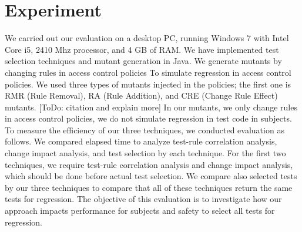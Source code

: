 \section{Experiment}\label{sec:experiment}

We carried out our evaluation on a desktop PC, running Windows 7 with Intel Core i5, 2410 Mhz processor, and 4 GB of RAM. 
We have implemented test selection techniques and mutant generation in Java.
We generate mutants by changing rules
in access control policies To simulate regression in access control policies.
We used three types of mutants injected in the policies; the first one
is RMR (Rule Removal), RA (Rule Addition), and CRE (Change Rule Effect)
mutants. [ToDo: citation and explain more] In our mutants, we only change rules in access control policies,
we do not simulate regression in test code in subjects.
To measure the efficiency of our three techniques, we conducted evaluation as follows. 
We compared elapsed time to analyze test-rule correlation analysis,
change impact analysis, and test selection by each technique.
For the first two techniques, we require test-rule correlation analysis
and change impact analysis, which should be done before actual test selection.
We compare also selected tests by our three techniques to
compare that all of these techniques return the same tests for regression.
The objective of this evaluation is to investigate how our approach impacts performance for subjects and safety
to select all tests for regression.


  

